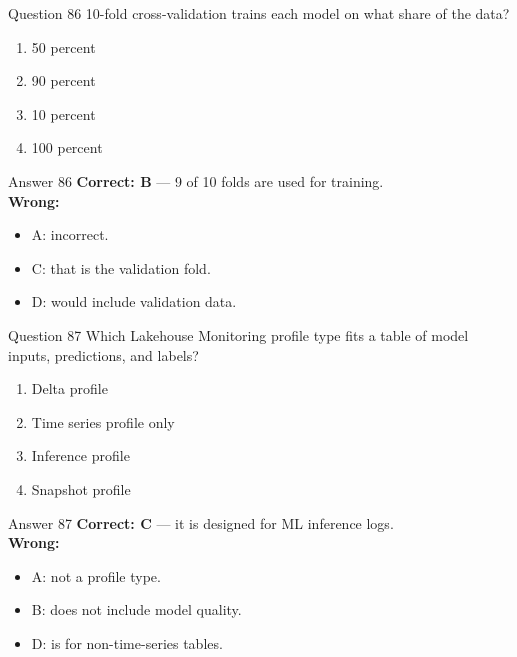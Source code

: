 \documentclass[aspectratio=169,11pt]{beamer}
\begin{document}
\begin{frame}{Question 86}
10-fold cross-validation trains each model on what share of the data?
\begin{enumerate}[label=\Alph*.]
\item 50 percent
\item 90 percent
\item 10 percent
\item 100 percent
\end{enumerate}
\end{frame}
\begin{frame}{Answer 86}
\textbf{Correct: B} --- 9 of 10 folds are used for training.\\
\vspace{0.5em}
\textbf{Wrong:}
\begin{itemize}
\item A: incorrect.
\item C: that is the validation fold.
\item D: would include validation data.
\end{itemize}
\end{frame}

\begin{frame}{Question 87}
Which Lakehouse Monitoring profile type fits a table of model inputs, predictions, and labels?
\begin{enumerate}[label=\Alph*.]
\item Delta profile
\item Time series profile only
\item Inference profile
\item Snapshot profile
\end{enumerate}
\end{frame}
\begin{frame}{Answer 87}
\textbf{Correct: C} --- it is designed for ML inference logs.\\
\vspace{0.5em}
\textbf{Wrong:}
\begin{itemize}
\item A: not a profile type.
\item B: does not include model quality.
\item D: is for non-time-series tables.
\end{itemize}
\end{frame}
\end{document}
